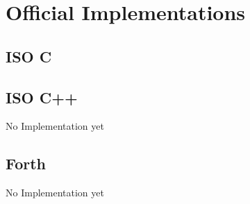 \documentclass{article}
\begin{document}
\section{Official Implementations}

\subsection{ISO C}


\subsection{ISO C++}

\begin{ImplCxx}
\item {No Implementation yet}
\end{ImplCxx}

\subsection{Forth}

\begin{ImplForth}
\item {No Implementation yet}
\end{ImplForth}
\end{document}
